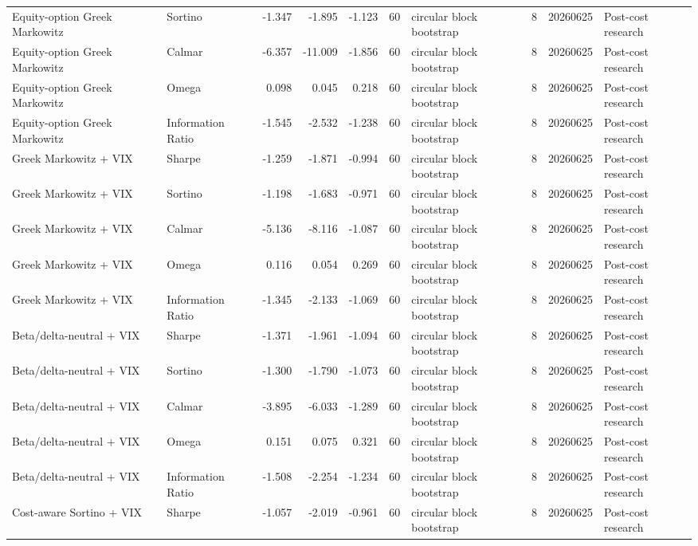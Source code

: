 \begin{tabular}{llrrrrlrrl}
Equity-option Greek Markowitz & Sortino & -1.347 & -1.895 & -1.123 & 60 & circular block bootstrap & 8 & 20260625 & Post-cost research \\
Equity-option Greek Markowitz & Calmar & -6.357 & -11.009 & -1.856 & 60 & circular block bootstrap & 8 & 20260625 & Post-cost research \\
Equity-option Greek Markowitz & Omega & 0.098 & 0.045 & 0.218 & 60 & circular block bootstrap & 8 & 20260625 & Post-cost research \\
Equity-option Greek Markowitz & Information Ratio & -1.545 & -2.532 & -1.238 & 60 & circular block bootstrap & 8 & 20260625 & Post-cost research \\
Greek Markowitz + VIX & Sharpe & -1.259 & -1.871 & -0.994 & 60 & circular block bootstrap & 8 & 20260625 & Post-cost research \\
Greek Markowitz + VIX & Sortino & -1.198 & -1.683 & -0.971 & 60 & circular block bootstrap & 8 & 20260625 & Post-cost research \\
Greek Markowitz + VIX & Calmar & -5.136 & -8.116 & -1.087 & 60 & circular block bootstrap & 8 & 20260625 & Post-cost research \\
Greek Markowitz + VIX & Omega & 0.116 & 0.054 & 0.269 & 60 & circular block bootstrap & 8 & 20260625 & Post-cost research \\
Greek Markowitz + VIX & Information Ratio & -1.345 & -2.133 & -1.069 & 60 & circular block bootstrap & 8 & 20260625 & Post-cost research \\
Beta/delta-neutral + VIX & Sharpe & -1.371 & -1.961 & -1.094 & 60 & circular block bootstrap & 8 & 20260625 & Post-cost research \\
Beta/delta-neutral + VIX & Sortino & -1.300 & -1.790 & -1.073 & 60 & circular block bootstrap & 8 & 20260625 & Post-cost research \\
Beta/delta-neutral + VIX & Calmar & -3.895 & -6.033 & -1.289 & 60 & circular block bootstrap & 8 & 20260625 & Post-cost research \\
Beta/delta-neutral + VIX & Omega & 0.151 & 0.075 & 0.321 & 60 & circular block bootstrap & 8 & 20260625 & Post-cost research \\
Beta/delta-neutral + VIX & Information Ratio & -1.508 & -2.254 & -1.234 & 60 & circular block bootstrap & 8 & 20260625 & Post-cost research \\
Cost-aware Sortino + VIX & Sharpe & -1.057 & -2.019 & -0.961 & 60 & circular block bootstrap & 8 & 20260625 & Post-cost research \\

\end{tabular}
